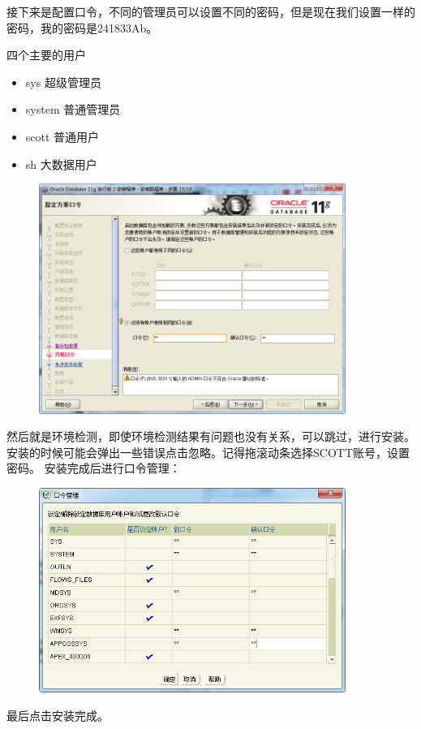 接下来是配置口令，不同的管理员可以设置不同的密码，但是现在我们设置一样的密码，我的密码是241833Ab。

四个主要的用户
\begin{itemize}
  \item sys 超级管理员
  \item system 普通管理员
  \item scott 普通用户
  \item sh 大数据用户
\end{itemize}

\begin{figure}[H]
  \centering
  \includegraphics[width=10cm]{oracle/安装步骤_指定配置_配置口令.png}
\end{figure}

然后就是环境检测，即使环境检测结果有问题也没有关系，可以跳过，进行安装。安装的时候可能会弹出一些错误点击忽略。记得拖滚动条选择SCOTT账号，设置密码。
安装完成后进行口令管理：
\begin{figure}[H]
  \centering
  \includegraphics[width=10cm]{oracle/口令管理.png}
\end{figure}
最后点击安装完成。


